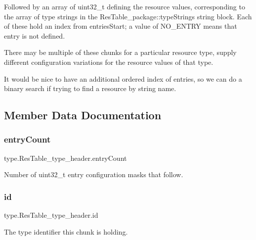 Followed by an array of uint32\+\_\+t defining the resource values, corresponding to the array of type strings in the Res\+Table\+\_\+package\+::type\+Strings string block. Each of these hold an index from entries\+Start; a value of N\+O\+\_\+\+E\+N\+T\+RY means that entry is not defined.

There may be multiple of these chunks for a particular resource type, supply different configuration variations for the resource values of that type.

It would be nice to have an additional ordered index of entries, so we can do a binary search if trying to find a resource by string name. 

\subsection{Member Data Documentation}
\mbox{\label{classtype_1_1ResTable__type__header_a5c2cd8db150389cf7996622a8074b309}} 
\subsubsection{\texorpdfstring{entry\+Count}{entryCount}}
{\footnotesize\ttfamily type.\+Res\+Table\+\_\+type\+\_\+header.\+entry\+Count}



Number of uint32\+\_\+t entry configuration masks that follow. 

\mbox{\label{classtype_1_1ResTable__type__header_adee0d1631145504aa375f9c1cefef1bf}} 
\subsubsection{\texorpdfstring{id}{id}}
{\footnotesize\ttfamily type.\+Res\+Table\+\_\+type\+\_\+header.\+id}



The type identifier this chunk is holding. 

